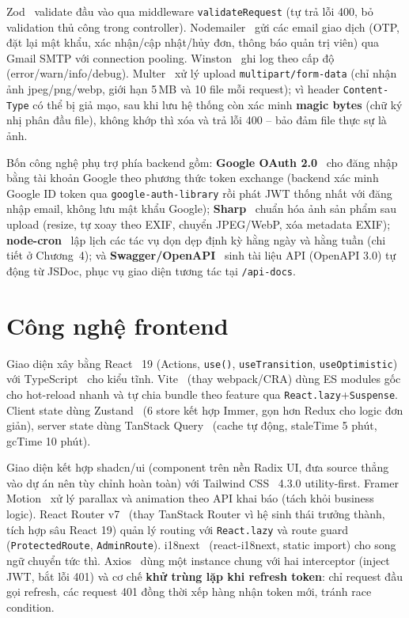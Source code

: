 Zod~\cite{zod_docs} validate đầu vào qua middleware \texttt{validateRequest} (tự trả lỗi 400, bỏ validation thủ công trong controller). Nodemailer~\cite{nodemailer_docs} gửi các email giao dịch (OTP, đặt lại mật khẩu, xác nhận\slash cập nhật\slash hủy đơn, thông báo quản trị viên) qua Gmail SMTP với connection pooling. Winston~\cite{winston_docs} ghi log theo cấp độ (error/warn/info/debug). Multer~\cite{multer_docs} xử lý upload \texttt{multipart/form-data} (chỉ nhận ảnh jpeg/png/webp, giới hạn 5\,MB và 10 file mỗi request); vì header \texttt{Content-Type} có thể bị giả mạo, sau khi lưu hệ thống còn xác minh \textbf{magic bytes} (chữ ký nhị phân đầu file), không khớp thì xóa và trả lỗi 400 -- bảo đảm file thực sự là ảnh.

Bốn công nghệ phụ trợ phía backend gồm: \textbf{Google OAuth 2.0}~\cite{google_oauth_docs} cho đăng nhập bằng tài khoản Google theo phương thức token exchange (backend xác minh Google ID token qua \texttt{google-auth-library} rồi phát JWT thống nhất với đăng nhập email, không lưu mật khẩu Google); \textbf{Sharp}~\cite{sharp_docs} chuẩn hóa ảnh sản phẩm sau upload (resize, tự xoay theo EXIF, chuyển JPEG\slash WebP, xóa metadata EXIF); \textbf{node-cron}~\cite{node_cron_docs} lập lịch các tác vụ dọn dẹp định kỳ hằng ngày và hằng tuần (chi tiết ở Chương~4); và \textbf{Swagger/OpenAPI}~\cite{swagger_docs} sinh tài liệu API (OpenAPI 3.0) tự động từ JSDoc, phục vụ giao diện tương tác tại \texttt{/api-docs}.

\section{Công nghệ frontend}
\label{sec:c2_frontend_tech}

Giao diện xây bằng React~\cite{react_docs} 19 (Actions, \texttt{use()}, \texttt{useTransition}, \texttt{useOptimistic}) với TypeScript~\cite{typescript_handbook} cho kiểu tĩnh. Vite~\cite{vite_docs} (thay webpack\slash CRA) dùng ES modules gốc cho hot-reload nhanh và tự chia bundle theo feature qua \texttt{React.lazy}+\texttt{Suspense}. Client state dùng Zustand~\cite{zustand_docs} (6 store kết hợp Immer, gọn hơn Redux cho logic đơn giản), server state dùng TanStack Query~\cite{tanstack_query_docs} (cache tự động, staleTime 5 phút, gcTime 10 phút).

Giao diện kết hợp shadcn/ui (component trên nền Radix UI, đưa source thẳng vào dự án nên tùy chỉnh hoàn toàn) với Tailwind CSS~\cite{tailwindcss_docs} 4.3.0 utility-first. Framer Motion~\cite{framer_motion_docs} xử lý parallax và animation theo API khai báo (tách khỏi business logic). React Router v7~\cite{react_router_docs} (thay TanStack Router vì hệ sinh thái trưởng thành, tích hợp sâu React 19) quản lý routing với \texttt{React.lazy} và route guard (\texttt{ProtectedRoute}, \texttt{AdminRoute}). i18next~\cite{i18next_docs} (react-i18next, static import) cho song ngữ chuyển tức thì. Axios~\cite{axios_docs} dùng một instance chung với hai interceptor (inject JWT, bắt lỗi 401) và cơ chế \textbf{khử trùng lặp khi refresh token}: chỉ request đầu gọi refresh, các request 401 đồng thời xếp hàng nhận token mới, tránh race condition.

